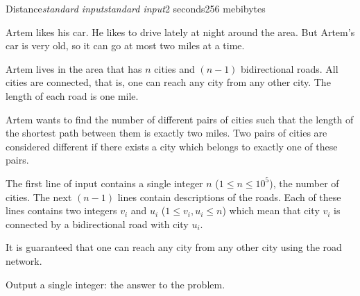 \begin{problem}{Distance}{\textsl{standard input}}{\textsl{standard input}}{2 seconds}{256 mebibytes}{}

Artem likes his car. He likes to drive lately at night around the area. But Artem's car is very old, so it can go at most two miles at a time.

Artem lives in the area that has $n$ cities and $(n - 1)$ bidirectional roads. All cities are connected, that is, one can reach any city from any other city. The length of each road is one mile.

Artem wants to find the number of different pairs of cities such that the length of the shortest path between them is exactly two miles. Two pairs of cities are considered different if there exists a city which belongs to exactly one of these pairs.

\InputFile
The first line of input contains a single integer $n$ ($1 \le n \le 10^5$), the number of cities. The next $(n - 1)$ lines contain descriptions of the roads. Each of these lines contains two integers $v_i$ and $u_i$ ($1 \le v_i, u_i \le n$) which mean that city $v_i$ is connected by a bidirectional road with city $u_i$.

It is guaranteed that one can reach any city from any other city using the road network.

\OutputFile
Output a single integer: the answer to the problem.

\Examples

\begin{example}
%
%
\end{example}

\end{problem}
